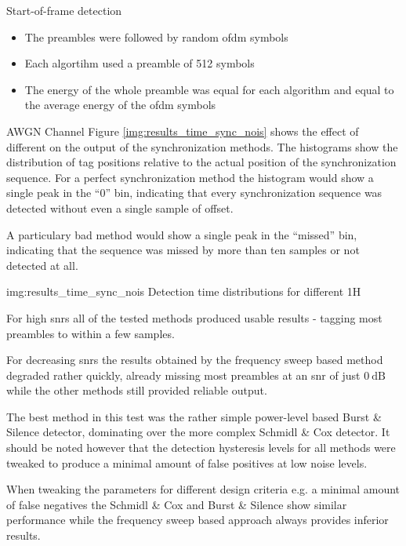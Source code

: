 \begin{subchapter}{Start-of-frame detection}
  \begin{itemize}
    \item
      The preambles were followed by random \gls{ofdm} symbols

    \item
      Each algortihm used a preamble of 512 symbols

    \item
      The energy of the whole preamble was equal for each
      algorithm and equal to the average energy of the \gls{ofdm}
      symbols
  \end{itemize}

  \begin{subsubchapter}{AWGN Channel}
    Figure \ref{img:results_time_sync_nois} shows the effect of
    different  on the output of the synchronization
    methods.
    The histograms show the distribution of tag positions
    relative to the actual position of the synchronization
    sequence.
    For a perfect synchronization method the histogram would
    show a single peak in the ``$0$'' bin, indicating that every
    synchronization sequence was detected without even a single
    sample of offset.

    A particulary bad method would show a single peak in the
    ``missed'' bin, indicating that the sequence was missed by
    more than ten samples or not detected at all.

                 {img:results_time_sync_nois}
                 {Detection time distributions for different }
                 {1}{H}

    For high \glspl{snr} all of the tested methods produced
    usable results - tagging most preambles to within a few
    samples.

    For decreasing \glspl{snr} the results obtained by the
    frequency sweep based method degraded rather quickly,
    already missing most
    preambles at an \gls{snr} of just $\SI{0}{\deci\bel}$
    while the other methods still provided reliable output.

    The best method in this test was the rather simple
    power-level based Burst \& Silence detector, dominating
    over the more complex Schmidl \& Cox detector.
    It should be noted however that the detection hysteresis levels
    for all methods were tweaked to produce a minimal amount
    of false positives at low noise levels.

    When tweaking the parameters for different design criteria
    e.g. a minimal amount of false negatives the Schmidl \& Cox
    and Burst \& Silence show similar performance while
    the frequency sweep based approach always provides inferior
    results.
  \end{subsubchapter}


\end{subchapter}
